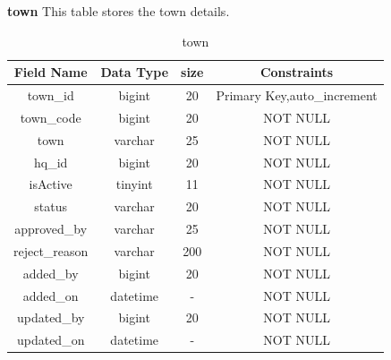 \textbf{town} This table stores the  town details.\nolinebreak
\begin{table}[hp]
\centering
\begin{tabular}{|c|c|c|c|}
\hline
\textbf{Field Name}  & \textbf{Data Type}  & \textbf{size} &\textbf{Constraints}  \\
\hline
 town\_id	& bigint &	20 & Primary Key,auto\_increment \\\hline
 town\_code &	bigint	 & 20 & NOT NULL \\\hline
town &	 varchar &	25 & NOT NULL \\\hline
hq\_id &	bigint &	20 & NOT NULL \\\hline
isActive &	tinyint &	11 & NOT NULL \\\hline
status &	varchar &	20 & NOT NULL \\\hline
approved\_by &	varchar &	25 & NOT NULL \\\hline
reject\_reason &	varchar &	200 & NOT NULL \\\hline
added\_by &	bigint &	20 & NOT NULL \\\hline
added\_on &	datetime &	- & NOT NULL \\\hline
updated\_by &	bigint &	20 & NOT NULL \\\hline
updated\_on &	datetime &	- & NOT NULL \\\hline
 
\end{tabular}
\caption{town}
\end{table}

